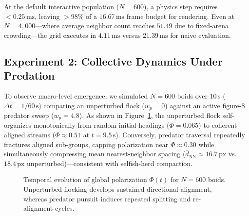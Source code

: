 \documentclass[10pt,twocolumn]{article}
\begin{document}
At the default interactive population ($N = 600$), a physics step requires $<0.25\,\text{ms}$, leaving $>98\%$ of a $16.67\,\text{ms}$ frame budget for rendering. Even at $N = 4{,}000$---where average neighbor count reaches $51.49$ due to fixed-arena crowding---the grid executes in $4.11\,\text{ms}$ versus $21.39\,\text{ms}$ for naive evaluation.

\subsection{Experiment 2: Collective Dynamics Under Predation}
To observe macro-level emergence, we simulated $N = 600$ boids over $10\,\text{s}$ ($\Delta t = 1/60\,\text{s}$) comparing an unperturbed flock ($w_p = 0$) against an active figure-8 predator sweep ($w_p = 4.8$). As shown in Figure~\ref{fig:dynamics}, the unperturbed flock self-organizes monotonically from random initial headings ($\Phi = 0.065$) to coherent aligned streams ($\Phi \approx 0.51$ at $t=9.5\,\text{s}$). Conversely, predator traversal repeatedly fractures aligned sub-groups, capping polarization near $\Phi \approx 0.30$ while simultaneously compressing mean nearest-neighbor spacing ($\bar{d}_{\text{NN}} \approx 16.7\,\text{px}$ vs.\ $18.4\,\text{px}$ unperturbed)---consistent with selfish-herd compaction.

\begin{figure}[t]
\centering
{}
\caption{Temporal evolution of global polarization $\Phi(t)$ for $N=600$ boids. Unperturbed flocking develops sustained directional alignment, whereas predator pursuit induces repeated splitting and re-alignment cycles.}
\label{fig:dynamics}
\end{figure}
\end{document}

